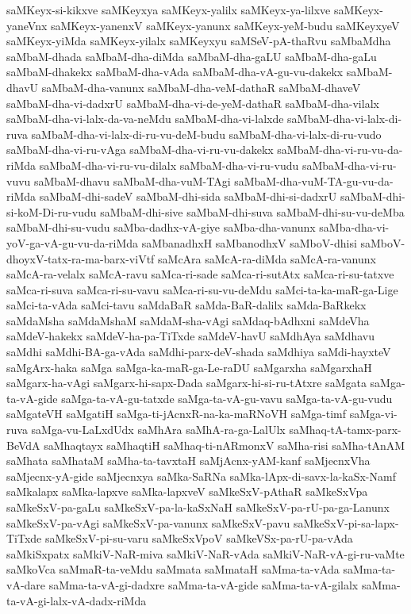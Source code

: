 {saMKeyx-si-kikxve
saMKeyxya
saMKeyx-yalilx
saMKeyx-ya-lilxve
saMKeyx-yaneVnx
saMKeyx-yanenxV
saMKeyx-yanunx
saMKeyx-yeM-budu
saMKeyxyeV
saMKeyx-yiMda
saMKeyx-yilalx
saMKeyxyu
saMSeV-pA-thaRvu
saMbaMdha
saMbaM-dhada
saMbaM-dha-diMda
saMbaM-dha-gaLU
saMbaM-dha-gaLu
saMbaM-dhakekx
saMbaM-dha-vAda
saMbaM-dha-vA-gu-vu-dakekx
saMbaM-dhavU
saMbaM-dha-vanunx
saMbaM-dha-veM-dathaR
saMbaM-dhaveV
saMbaM-dha-vi-dadxrU
saMbaM-dha-vi-de-yeM-dathaR
saMbaM-dha-vilalx
saMbaM-dha-vi-lalx-da-va-neMdu
saMbaM-dha-vi-lalxde
saMbaM-dha-vi-lalx-di-ruva
saMbaM-dha-vi-lalx-di-ru-vu-deM-budu
saMbaM-dha-vi-lalx-di-ru-vudo
saMbaM-dha-vi-ru-vAga
saMbaM-dha-vi-ru-vu-dakekx
saMbaM-dha-vi-ru-vu-da-riMda
saMbaM-dha-vi-ru-vu-dilalx
saMbaM-dha-vi-ru-vudu
saMbaM-dha-vi-ru-vuvu
saMbaM-dhavu
saMbaM-dha-vuM-TAgi
saMbaM-dha-vuM-TA-gu-vu-da-riMda
saMbaM-dhi-sadeV
saMbaM-dhi-sida
saMbaM-dhi-si-dadxrU
saMbaM-dhi-si-koM-Di-ru-vudu
saMbaM-dhi-sive
saMbaM-dhi-suva
saMbaM-dhi-su-vu-deMba
saMbaM-dhi-su-vudu
saMba-dadhx-vA-giye
saMba-dha-vanunx
saMba-dha-vi-yoV-ga-vA-gu-vu-da-riMda
saMbanadhxH
saMbanodhxV
saMboV-dhisi
saMboV-dhoyxV-tatx-ra-ma-barx-viVtf
saMcAra
saMcA-ra-diMda
saMcA-ra-vanunx
saMcA-ra-velalx
saMcA-ravu
saMca-ri-sade
saMca-ri-sutAtx
saMca-ri-su-tatxve
saMca-ri-suva
saMca-ri-su-vavu
saMca-ri-su-vu-deMdu
saMci-ta-ka-maR-ga-Lige
saMci-ta-vAda
saMci-tavu
saMdaBaR
saMda-BaR-dalilx
saMda-BaRkekx
saMdaMsha
saMdaMshaM
saMdaM-sha-vAgi
saMdaq-bAdhxni
saMdeVha
saMdeV-hakekx
saMdeV-ha-pa-TiTxde
saMdeV-havU
saMdhAya
saMdhavu
saMdhi
saMdhi-BA-ga-vAda
saMdhi-parx-deV-shada
saMdhiya
saMdi-hayxteV
saMgArx-haka
saMga
saMga-ka-maR-ga-Le-raDU
saMgarxha
saMgarxhaH
saMgarx-ha-vAgi
saMgarx-hi-sapx-Dada
saMgarx-hi-si-ru-tAtxre
saMgata
saMga-ta-vA-gide
saMga-ta-vA-gu-tatxde
saMga-ta-vA-gu-vavu
saMga-ta-vA-gu-vudu
saMgateVH
saMgatiH
saMga-ti-jAcnxR-na-ka-maRNoVH
saMga-timf
saMga-vi-ruva
saMga-vu-LaLxdUdx
saMhAra
saMhA-ra-ga-LalUlx
saMhaq-tA-tamx-parx-BeVdA
saMhaqtayx
saMhaqtiH
saMhaq-ti-nARmonxV
saMha-risi
saMha-tAnAM
saMhata
saMhataM
saMha-ta-tavxtaH
saMjAcnx-yAM-kanf
saMjecnxVha
saMjecnx-yA-gide
saMjecnxya
saMka-SaRNa
saMka-lApx-di-savx-la-kaSx-Namf
saMkalapx
saMka-lapxve
saMka-lapxveV
saMkeSxV-pAthaR
saMkeSxVpa
saMkeSxV-pa-gaLu
saMkeSxV-pa-la-kaSxNaH
saMkeSxV-pa-rU-pa-ga-Lanunx
saMkeSxV-pa-vAgi
saMkeSxV-pa-vanunx
saMkeSxV-pavu
saMkeSxV-pi-sa-lapx-TiTxde
saMkeSxV-pi-su-varu
saMkeSxVpoV
saMkeVSx-pa-rU-pa-vAda
saMkiSxpatx
saMkiV-NaR-miva
saMkiV-NaR-vAda
saMkiV-NaR-vA-gi-ru-vaMte
saMkoVca
saMmaR-ta-veMdu
saMmata
saMmataH
saMma-ta-vAda
saMma-ta-vA-dare
saMma-ta-vA-gi-dadxre
saMma-ta-vA-gide
saMma-ta-vA-gilalx
saMma-ta-vA-gi-lalx-vA-dadx-riMda
}
